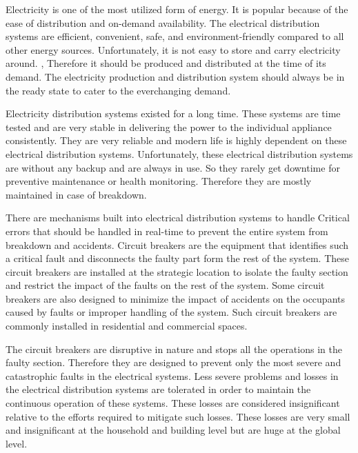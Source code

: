 
Electricity is one of the most utilized form of energy. It is popular because of the ease of distribution and on-demand availability. The electrical distribution systems are efficient, convenient, safe, and environment-friendly compared to all other energy sources. Unfortunately, it is not easy to store and carry electricity around. , Therefore it should be produced and distributed at the time of its demand. The electricity production and distribution system should always be in the ready state to cater to the everchanging demand. 



Electricity distribution systems existed for a long time. These systems are time tested and are very stable in delivering the power to the individual appliance consistently. They are very reliable and modern life is highly dependent on these electrical distribution systems. Unfortunately, these electrical distribution systems are without any backup and are always in use. So they rarely get downtime for preventive maintenance or health monitoring. Therefore they are mostly maintained in case of breakdown.

There are mechanisms built into electrical distribution systems to handle Critical errors that should be handled in real-time to prevent the entire system from breakdown and accidents. Circuit breakers are the equipment that identifies such a critical fault and disconnects the faulty part form the rest of the system. These circuit breakers are installed at the strategic location to isolate the faulty section and restrict the impact of the faults on the rest of the system. Some circuit breakers are also designed to minimize the impact of accidents on the occupants caused by faults or improper handling of the system. Such circuit breakers are commonly installed in residential and commercial spaces.

The circuit breakers are disruptive in nature and stops all the operations in the faulty section. Therefore they are designed to prevent only the most severe and catastrophic faults in the electrical systems. Less severe problems and losses in the electrical distribution systems are tolerated in order to maintain the continuous operation of these systems. These losses are considered insignificant relative to the efforts required to mitigate such losses. These losses are very small and insignificant at the household and building level but are huge at the global level.

